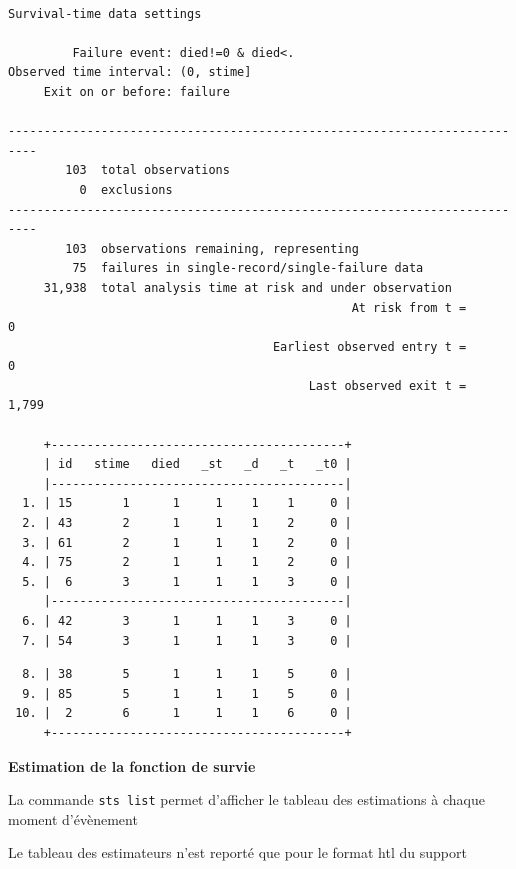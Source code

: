 \documentclass[
  12pt,
  letterpaper,
  DIV=11,
  numbers=noendperiod,
  onepage,
  openany]{scrreprt}
\begin{document}
\begin{verbatim}

Survival-time data settings

         Failure event: died!=0 & died<.
Observed time interval: (0, stime]
     Exit on or before: failure

--------------------------------------------------------------------------
        103  total observations
          0  exclusions
--------------------------------------------------------------------------
        103  observations remaining, representing
         75  failures in single-record/single-failure data
     31,938  total analysis time at risk and under observation
                                                At risk from t =         0
                                     Earliest observed entry t =         0
                                          Last observed exit t =     1,799

     +-----------------------------------------+
     | id   stime   died   _st   _d   _t   _t0 |
     |-----------------------------------------|
  1. | 15       1      1     1    1    1     0 |
  2. | 43       2      1     1    1    2     0 |
  3. | 61       2      1     1    1    2     0 |
  4. | 75       2      1     1    1    2     0 |
  5. |  6       3      1     1    1    3     0 |
     |-----------------------------------------|
  6. | 42       3      1     1    1    3     0 |
  7. | 54       3      1     1    1    3     0 |
\end{verbatim}

\begin{verbatim}
  8. | 38       5      1     1    1    5     0 |
  9. | 85       5      1     1    1    5     0 |
 10. |  2       6      1     1    1    6     0 |
     +-----------------------------------------+
\end{verbatim}

\textbf{Estimation de la fonction de survie}

La commande \texttt{sts\ list} permet d'afficher le tableau des
estimations à chaque moment d'évènement

\begin{tcolorbox}[enhanced jigsaw, arc=.35mm, bottomrule=.15mm, titlerule=0mm, colbacktitle=quarto-callout-note-color!10!white, left=2mm, opacitybacktitle=0.6, toprule=.15mm, title=\textcolor{quarto-callout-note-color}{\faInfo}\hspace{0.5em}{Note}, colframe=quarto-callout-note-color-frame, breakable, coltitle=black, opacityback=0, toptitle=1mm, bottomtitle=1mm, rightrule=.15mm, leftrule=.75mm, colback=white]

Le tableau des estimateurs n'est reporté que pour le format htl du
support

\end{tcolorbox}
\end{document}
